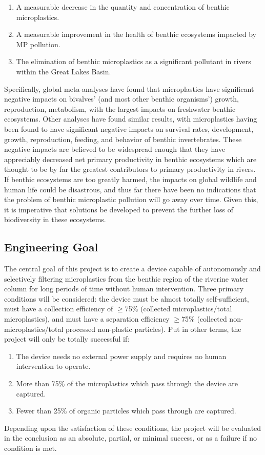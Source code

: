 \documentclass[fleqn,10pt]{SelfArx} %
\begin{document}
	\begin{enumerate}
		\item A measurable decrease in the quantity and concentration of \gls{benthic} microplastics.
		\item A measurable improvement in the health of \gls{benthic} ecosystems impacted by MP pollution. 
		\item The elimination of \gls{benthic} microplastics as a significant pollutant in rivers within the Great Lakes Basin.
		
	\end{enumerate}
	Specifically, global meta-analyses have found that microplastics have significant negative impacts on bivalves' (and most other benthic organisms') growth, reproduction, metabolism, with the largest impacts on freshwater benthic ecosystems\cite{BERLINO2021117174}. Other analyses have found similar results, with microplastics having been found to have significant negative impacts on survival rates, development, growth, reproduction, feeding, and behavior of benthic invertebrates\cite{MASON2022157362}. These negative impacts are believed to be widespread enough that they have appreciably decreased net primary productivity in benthic ecosystems which are thought to be by far the greatest contributors to primary productivity in rivers\cite{DAVIES200823}. If benthic ecosystems are too greatly harmed, the impacts on global wildlife and human life could be disastrous, and thus far there have been no indications that the problem of benthic microplastic pollution will go away over time. Given this, it is imperative that solutions be developed to prevent the further loss of biodiversity in these ecosystems. 
	
	\printglossaries
	
	
	
	
	\subsection{Engineering Goal}
	\label{sec:goals}
	The central goal of this project is to create a device capable of autonomously and selectively filtering microplastics from the \gls{benthic} region of the riverine water column for long periods of time without human intervention. Three primary conditions will be considered: the device must be almost totally self-sufficient, must have a collection efficiency of $\geq$75\% (collected microplastics/total microplastics), and must have a separation efficiency $\geq$75\% (collected non-microplastics/total processed non-plastic particles). Put in other terms, the project will only be totally successful if:
	\begin{enumerate}
		\item The device needs no external power supply and requires no human intervention to operate.
		\item More than 75\% of the microplastics which pass through the device are captured.
		\item Fewer than 25\% of organic particles which pass through are captured.	
	\end{enumerate}
	Depending upon the satisfaction of these conditions, the project will be evaluated in the conclusion as an absolute, partial, or minimal success, or as a failure if no condition is met.
\end{document}
